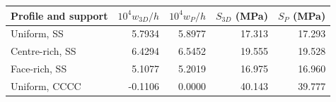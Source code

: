 \begin{tabularx}{\linewidth}{Xrrrr}
\toprule
Profile and support & $10^4 w_{3D}/h$ & $10^4 w_P/h$ & $S_{3D}$ (MPa) & $S_P$ (MPa) \\
\midrule
Uniform, SS & 5.7934 & 5.8977 & 17.313 & 17.293 \\
Centre-rich, SS & 6.4294 & 6.5452 & 19.555 & 19.528 \\
Face-rich, SS & 5.1077 & 5.2019 & 16.975 & 16.960 \\
Uniform, CCCC & -0.1106 & 0.0000 & 40.143 & 39.777 \\
\bottomrule
\end{tabularx}
